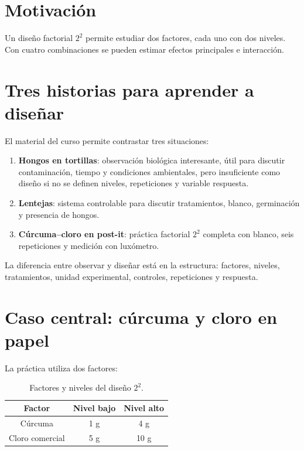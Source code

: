 
\section{Motivación}

Un diseño factorial \(2^2\) permite estudiar dos factores, cada uno con dos niveles. Con cuatro combinaciones se pueden estimar efectos principales e interacción.

\section{Tres historias para aprender a diseñar}

El material del curso permite contrastar tres situaciones:

\begin{enumerate}
  \item \textbf{Hongos en tortillas}: observación biológica interesante, útil para discutir contaminación, tiempo y condiciones ambientales, pero insuficiente como diseño si no se definen niveles, repeticiones y variable respuesta.
  \item \textbf{Lentejas}: sistema controlable para discutir tratamientos, blanco, germinación y presencia de hongos.
  \item \textbf{Cúrcuma--cloro en post-it}: práctica factorial \(2^2\) completa con blanco, seis repeticiones y medición con luxómetro.
\end{enumerate}

\begin{idea}
La diferencia entre observar y diseñar está en la estructura: factores, niveles, tratamientos, unidad experimental, controles, repeticiones y respuesta.
\end{idea}

\section{Caso central: cúrcuma y cloro en papel}

La práctica utiliza dos factores:

\begin{table}[H]
\centering
\begin{tabular}{ccc}
\toprule
Factor & Nivel bajo & Nivel alto\\
\midrule
Cúrcuma & 1 g & 4 g\\
Cloro comercial & 5 g & 10 g\\
\bottomrule
\end{tabular}
\caption{Factores y niveles del diseño \(2^2\).}
\end{table}

